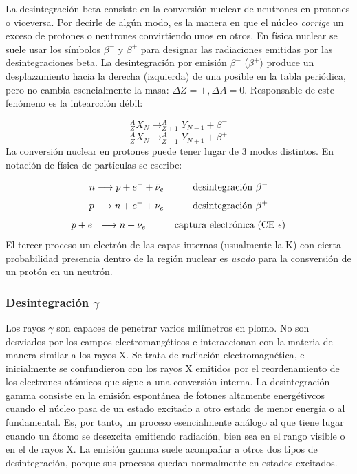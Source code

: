 La desintegración beta consiste en la conversión nuclear de neutrones en protones o viceversa. Por decirle de algún modo, es la manera en que el núcleo \textit{corrige} un exceso de protones o neutrones convirtiendo unos en otros. En física nuclear se suele usar los símbolos $\beta^-$ y $\beta^+$ para designar las radiaciones emitidas por las desintegraciones beta. La desintegración por emisión $\beta^-$ ($\beta^+)$ produce un desplazamiento hacia la derecha (izquierda) de una posible en la tabla periódica, pero no cambia esencialmente la masa: $\Delta Z = \pm, \Delta A = 0$. Responsable de este fenómeno es la intearcción débil:

\begin{equation}
	^A_Z X_N \longrightarrow ^A_{Z+1} Y_{N-1} + \beta^-
\end{equation}
\begin{equation}
	^A_Z X_N \longrightarrow ^A_{Z-1} Y_{N+1} + \beta^+
\end{equation}
La conversión nuclear en protones puede tener lugar de 3 modos distintos. En notación de física de partículas se escribe:

\begin{equation}
	n \longrightarrow p + e^- + \bar{\nu}_e  \quad \quad \quad \text{desintegración} \ \beta^-
\end{equation}
\begin{equation}
	p \longrightarrow n + e^+ + {\nu}_e \quad \quad \quad \text{desintegración} \ \beta^+
\end{equation}
\begin{equation}
	p + e^- \longrightarrow n + {\nu}_e \quad \quad \quad \text{captura electrónica (CE} \ \epsilon)
\end{equation}
El tercer proceso un electrón de las capas internas (usualmente la K) con cierta probabilidad presencia dentro de la región nuclear es \textit{usado} para la consversión de un protón en un neutrón.

\subsubsection{Desintegración $\gamma$}

Los rayos $\gamma$ son capaces de penetrar varios milímetros en plomo. No son desviados por los campos electromangéticos e interaccionan con la materia de manera similar a los rayos X. Se trata de radiación electromagnética, e inicialmente se confundieron con los rayos X emitidos por el reordenamiento de los electrones atómicos que sigue a una conversión interna. La desintegración gamma consiste en la emisión espontánea de fotones altamente energétivcos cuando el núcleo pasa de un estado excitado a otro estado de menor energía o al fundamental. Es, por tanto, un proceso esencialmente análogo al que tiene lugar cuando un átomo se desexcita emitiendo radiación, bien sea en el rango visible o en el de rayos X. La emisión gamma suele acompañar a otros dos tipos de desintegración, porque sus procesos quedan normalmente en estados excitados.

